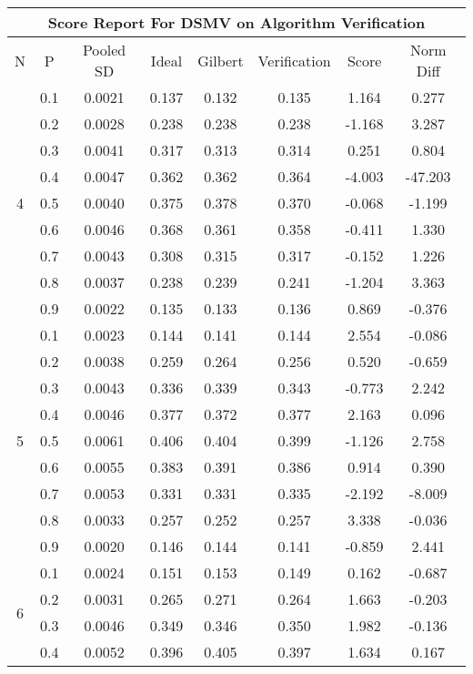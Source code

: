 \documentclass[11pt,a4paper]{report}
\begin{document}
\begin{longtable}{ | c | c || c | c | c | c | c | c | }
\hline
\multicolumn{8}{|c|}{ Score Report For DSMV on Algorithm Verification} \\
\hline
N & P & Pooled SD &  Ideal &  Gilbert & Verification  & Score & Norm Diff \\
 \hline
 \hline
 \endhead
\multirow{9}{*}{4} & 0.1 & 0.0021 & 0.137 & 0.132 & 0.135 & 1.164 & 0.277 \\
 & 0.2 & 0.0028 & 0.238 & 0.238 & 0.238 & -1.168 & 3.287 \\
 & 0.3 & 0.0041 & 0.317 & 0.313 & 0.314 & 0.251 & 0.804 \\
 & 0.4 & 0.0047 & 0.362 & 0.362 & 0.364 & -4.003 & -47.203 \\
 & 0.5 & 0.0040 & 0.375 & 0.378 & 0.370 & -0.068 & -1.199 \\
 & 0.6 & 0.0046 & 0.368 & 0.361 & 0.358 & -0.411 & 1.330 \\
 & 0.7 & 0.0043 & 0.308 & 0.315 & 0.317 & -0.152 & 1.226 \\
 & 0.8 & 0.0037 & 0.238 & 0.239 & 0.241 & -1.204 & 3.363 \\
 & 0.9 & 0.0022 & 0.135 & 0.133 & 0.136 & 0.869 & -0.376 \\
 \hline
\multirow{9}{*}{5} & 0.1 & 0.0023 & 0.144 & 0.141 & 0.144 & 2.554 & -0.086 \\
 & 0.2 & 0.0038 & 0.259 & 0.264 & 0.256 & 0.520 & -0.659 \\
 & 0.3 & 0.0043 & 0.336 & 0.339 & 0.343 & -0.773 & 2.242 \\
 & 0.4 & 0.0046 & 0.377 & 0.372 & 0.377 & 2.163 & 0.096 \\
 & 0.5 & 0.0061 & 0.406 & 0.404 & 0.399 & -1.126 & 2.758 \\
 & 0.6 & 0.0055 & 0.383 & 0.391 & 0.386 & 0.914 & 0.390 \\
 & 0.7 & 0.0053 & 0.331 & 0.331 & 0.335 & -2.192 & -8.009 \\
 & 0.8 & 0.0033 & 0.257 & 0.252 & 0.257 & 3.338 & -0.036 \\
 & 0.9 & 0.0020 & 0.146 & 0.144 & 0.141 & -0.859 & 2.441 \\
 \hline
\multirow{9}{*}{6} & 0.1 & 0.0024 & 0.151 & 0.153 & 0.149 & 0.162 & -0.687 \\
 & 0.2 & 0.0031 & 0.265 & 0.271 & 0.264 & 1.663 & -0.203 \\
 & 0.3 & 0.0046 & 0.349 & 0.346 & 0.350 & 1.982 & -0.136 \\
 & 0.4 & 0.0052 & 0.396 & 0.405 & 0.397 & 1.634 & 0.167 \\

\end{longtable}
\end{document}
